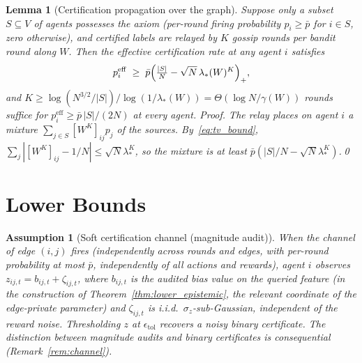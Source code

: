 \documentclass[11pt]{article}
\newtheorem{lemma}[theorem]{Lemma}
\newtheorem{assumption}[theorem]{Assumption}
\begin{document}
\begin{lemma}[Certification propagation over the graph]\label{lem:prop}
Suppose only a subset $S\subseteq V$ of agents possesses the axiom
(per-round firing probability $p_i\geq\bar p$ for $i\in S$, zero
otherwise), and certified labels are relayed by $K$ gossip rounds per
bandit round along $W$.  Then the effective certification rate at any
agent $i$ satisfies
\[
p^{\mathrm{eff}}_i\;\geq\;\bar p\Bigl(\tfrac{|S|}{N}-\sqrt{N}\,\lambda_*(W)^K\Bigr)_+ ,
\]
and $K\geq\log(N^{3/2}/|S|)/\log(1/\lambda_*(W))
=\Theta(\log N/\gamma(W))$ rounds suffice for
$p_i^{\mathrm{eff}}\geq\bar p\,|S|/(2N)$ at every agent.
\emph{Proof.}  The relay places on agent $i$ a mixture
$\sum_{j\in S}[W^K]_{ij}p_j$ of the sources. By~\eqref{eq:tv_bound},
$\sum_j|[W^K]_{ij}-1/N|\leq\sqrt{N}\lambda_*^K$, so the mixture is at
least $\bar p(|S|/N-\sqrt N\lambda_*^K)$.\qed
\end{lemma}

\section{Lower Bounds}\label{sec:lower}

\begin{assumption}[Soft certification channel (magnitude audit)]
\label{ass:softcert}
When the channel of edge $(i,j)$ fires (independently across rounds
and edges, with per-round probability at most $\bar p$, independently
of all actions and rewards), agent $i$ observes
$z_{ij,t}=b_{ij,t}+\zeta_{ij,t}$, where $b_{ij,t}$ is the audited bias
value on the queried feature (in the construction of
Theorem~\ref{thm:lower_epistemic}, the relevant coordinate of the
edge-private parameter) and $\zeta_{ij,t}$ is i.i.d.\
$\sigma_z$-sub-Gaussian, independent of the reward noise.
Thresholding $z$ at $\epsilon_{\mathrm{tol}}$ recovers a noisy binary
certificate. The distinction between magnitude audits and binary
certificates is consequential (Remark~\ref{rem:channel}).
\end{assumption}
\end{document}
